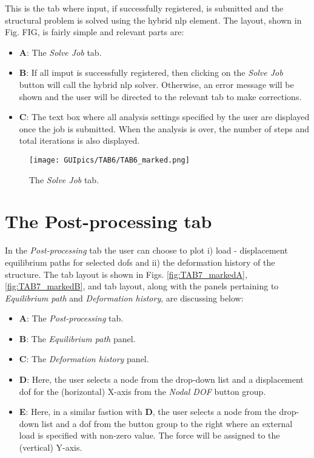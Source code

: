 \begin{appendices}
This is the tab where input, if successfully registered, is submitted and the 
structural problem is solved using the hybrid \acrshort{nlp} element. The 
layout, shown in Fig. FIG, is fairly simple and relevant parts are:

\begin{itemize}
	\item \textbf{A}: The \textit{Solve Job} tab.
	\item \textbf{B}: If all imput is successfully registered, then clicking on 
	the \textit{Solve Job} button will call the hybrid \acrshort{nlp} solver. 
	Otherwise, an error message will be shown and the user will be directed to 
	the relevant tab to make corrections.
	\item \textbf{C}: The text box where all analysis settings specified by the 
	user are displayed once the job is submitted. When the analysis is over, 
	the number of steps and total iterations is also displayed.
\end{itemize}


\begin{figure}[t]
	\centering
	\texttt{[image: GUIpics/TAB6/TAB6\_marked.png]}
	\caption{The \textit{Solve Job} tab.}
	\label{fig:TAB6_marked}
\end{figure}

\clearpage

\section*{The Post-processing tab}

In the \textit{Post-processing} tab the user can choose to plot i) load - 
displacement equilibrium paths for selected \acrshort{dof}s and ii) the 
deformation history of the structure. The tab layout is shown in Figs. 
\ref{fig:TAB7_markedA}, \ref{fig:TAB7_markedB}, and tab layout, along with the 
panels pertaining to \textit{Equilibrium path} and \textit{Deformation 
	history}, are discussing below:

\begin{itemize}
	\item \textbf{A}: The \textit{Post-processing} tab.
	\item \textbf{B}: The \textit{Equilibrium path} panel.
	\item \textbf{C}: The \textit{Deformation history} panel.
	\item \textbf{D}: Here, the user selects a node from the drop-down list and 
	a displacement \acrshort{dof} for the (horizontal) X-axis from the 
	\textit{Nodal DOF} button group.
	\item \textbf{E}: Here, in a similar fastion with \textbf{D}, the user 
	selects a node from the drop-down list and a \acrshort{dof} from the button 
	group to the right where an external load is specified with non-zero value. 
	The force will be assigned to the (vertical) Y-axis.
	

\end{itemize}
\end{appendices}

